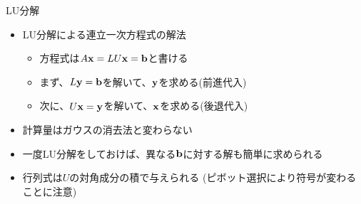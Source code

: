 \begin{frame}[t,fragile]{LU分解}
  \begin{itemize}
    \setlength{\itemsep}{1em}
  \item LU分解による連立一次方程式の解法
    \begin{itemize}
    \item 方程式は$A{\bf x} = LU{\bf x} = {\bf b}$と書ける
    \item まず、$L{\bf y} = {\bf b}$を解いて、${\bf y}$を求める(前進代入)
    \item 次に、$U{\bf x} = {\bf y}$を解いて、${\bf x}$を求める(後退代入)
    \end{itemize}
  \item 計算量はガウスの消去法と変わらない
  \item 一度LU分解をしておけば、異なる${\bf b}$に対する解も簡単に求められる
  \item 行列式は$U$の対角成分の積で与えられる (ピボット選択により符号が変わることに注意)
  \end{itemize}
\end{frame}
